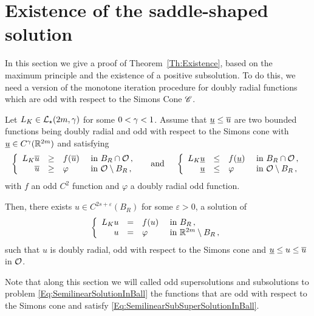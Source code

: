 \section{Existence of the saddle-shaped solution}
\label{Sec:Existence}


In this section we give a proof of Theorem~\ref{Th:Existence}, based on the maximum principle and the existence of a positive subsolution. To do this, we need a version of the monotone iteration procedure for doubly radial functions which are odd with respect to the Simons Cone $\mathscr{C}$.

\begin{proposition}
	\label{Prop:MonotoneIterationOdd}
	Let $L_K\in \mathcal{L}_\star(2m,\gamma)$ for some $0<\gamma<1$. Assume that $\underline{u} \leq \overline{u}$ are two bounded functions being doubly radial and odd with respect to the Simons cone with $\underline{u}\in C^\gamma(\mathbb{R}^{2m})$ and satisfying   
	\begin{equation}
	\label{Eq:SemilinearSubSuperSolutionInBall}
	\left\{\begin{array}{rcll}
	L_K\overline{u} & \geq & f(\overline{u}) & \textrm{ in } B_R \cap \mathcal{O}\,, \\
	\overline{u} & \geq & \varphi & \textrm{ in } \mathcal{O} \setminus B_R\,, 
	\end{array} \right.
	\quad \textrm{ and } \quad 
	\left\{\begin{array}{rcll}
	L_K\underline{u} & \leq & f(\underline{u}) & \textrm{ in } B_R \cap \mathcal{O}\,, \\
	\underline{u} & \leq & \varphi & \textrm{ in } \mathcal{O} \setminus B_R\,, 
	\end{array} \right.
	\end{equation}
	with $f$ an odd $C^2$ function and $\varphi$ a doubly radial odd function.
	
	Then, there exists $u\in C^{2s+\varepsilon}(B_R)$ for some $\varepsilon>0$, a solution of
	\begin{equation}
	\label{Eq:SemilinearSolutionInBall}
	\left\{\begin{array}{rcll}
	L_K u & = & f(u) & \textrm{ in } B_R\,, \\
	u &=& \varphi &  \textrm{ in } \mathbb{R}^{2m} \setminus B_R\,, 
	\end{array} \right.
	\end{equation}
	such that $u$ is doubly radial, odd with respect to the Simons cone and  $\underline{u} \leq u \leq \overline{u}$ in $\mathcal{O}$.
\end{proposition}
Note that along this section we will called odd supersolutions and subsolutions to problem \eqref{Eq:SemilinearSolutionInBall} the functions that are odd with respect to the Simons cone and satisfy \eqref{Eq:SemilinearSubSuperSolutionInBall}.

